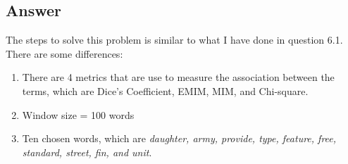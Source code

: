 \documentclass[letterpaper,11pt]{article}
\begin{document}
\subsection*{Answer}

The steps to solve this problem is similar to what I have done in question 6.1. There are some differences:
\begin{enumerate}
\item There are 4 metrics that are use to measure the association between the terms, which are Dice's Coefficient, EMIM, MIM, and Chi-square. 
\item Window size = 100 words
\item Ten chosen words, which are \textit{daughter, army, provide, type, feature, free, standard, street, fin, and unit}. 
\end{enumerate}
\end{document}

